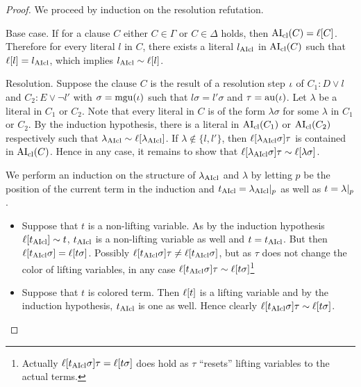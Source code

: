 \documentclass[,%
	draft=false,%
	numbers=noendperiod
	11pt,
	a4paper,
	oneside,%
	openany,
]{memoir}
\begin{document}
\begin{proof}
	We proceed by induction on the resolution refutation.
	\begin{description}
		\item{Base case.}
			If for a clause $C$ either $C\in \Gamma$ or $C \in \Delta$ holds, then $\operatorname{AI}_\mathrm{cl}(C) = \ell[C]$.
			Therefore for every literal $l$ in $C$, there exists a literal $l_{\operatorname{AIcl}}$ in $\operatorname{AI}_\mathrm{cl}(C)$ such that $\ell[l] = l_{\operatorname{AIcl}}$, which implies $l_{\operatorname{AIcl}} \sim \ell[l]$.

			\item{Resolution.}
				Suppose the clause $C$ is the result of a resolution step $\iota$ of $C_1: D \lor l$ and $C_2: E \lor \lnot l'$ with $\sigma=\operatorname{mgu}(\iota)$ such that $l\sigma = l'\sigma$ and $\tau =\nolinebreak \aiu(\inference)$.
				Let $\lambda$ be a literal in $C_1$ or $C_2$.
				Note that every literal in $C$ is of the form $\lambda\sigma$ for some $\lambda$ in $C_1$ or $C_2$.
				By the induction hypothesis, there is a literal in $\operatorname{AI}_\mathrm{cl}(C_1)$ or $\operatorname{AI}_\mathrm{cl}(C_2)$ respectively such that $\lambda_{\operatorname{AIcl}} \sim \ell[\lambda_{\operatorname{AIcl}}]$.
				If $\lambda \not\in\{l,l'\}$, then $\ell[\lambda_{\operatorname{AIcl}}\sigma]\tau$ is contained in $\operatorname{AI}_\mathrm{cl}(C)$.
				Hence in any case, it remains to show that $\ell[\lambda_{\operatorname{AIcl}}\sigma]\tau \sim \ell[\lambda\sigma]$.

				We perform an induction on the structure of $\lambda_{\operatorname{AIcl}}$ and $\lambda$
				by letting $p$ be the position of the current term in the induction and $t_{\operatorname{AIcl}} = \lambda_{\operatorname{AIcl}}|_{p}$ as well as $t=\lambda|_{p}$.
				\begin{itemize}
					\item
						Suppose that $t$ is a non-lifting variable.
						As by the induction hypothesis $\ell[t_{\operatorname{AIcl}}] \sim t$, $t_{\operatorname{AIcl}}$ is a non-lifting variable as well and $t = t_{\operatorname{AIcl}}$.
						But then $\ell[t_{\operatorname{AIcl}}\sigma] = \ell[t\sigma]$.
						Possibly $\ell[t_{\operatorname{AIcl}}\sigma]\tau \neq \ell[t_{\operatorname{AIcl}}\sigma]$, but as $\tau$ does not change the color of lifting variables, in any case $\ell[t_{\operatorname{AIcl}}\sigma]\tau \sim \ell[t\sigma]$\footnote{Actually $\ell[t_{\operatorname{AIcl}}\sigma]\tau = \ell[t\sigma]$ does hold as $\tau$ ``resets'' lifting variables to the actual terms.}

					\item
						Suppose that $t$ is colored term.
						Then $\ell[t]$ is a lifting variable and by the induction hypothesis, $t_{\operatorname{AIcl}}$ is one as well.
						Hence clearly $\ell[t_{\operatorname{AIcl}}\sigma]\tau \sim \ell[t\sigma]$.


\end{itemize}
\end{description}
\end{proof}
\end{document}
